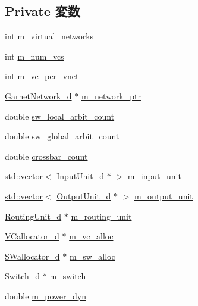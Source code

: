 \subsection*{Private 変数}
\begin{DoxyCompactItemize}
\item 
int \hyperlink{classRouter__d_af4cc96182e80059859793d92cb3dd769}{m\_\-virtual\_\-networks}
\item 
int \hyperlink{classRouter__d_a2e1a9213321dfa0386cdedaf6fc22996}{m\_\-num\_\-vcs}
\item 
int \hyperlink{classRouter__d_a2d66b8cad5144408ed492eeff4d37c2f}{m\_\-vc\_\-per\_\-vnet}
\item 
\hyperlink{classGarnetNetwork__d}{GarnetNetwork\_\-d} $\ast$ \hyperlink{classRouter__d_a06e7449414412196933a6b9c28556969}{m\_\-network\_\-ptr}
\item 
double \hyperlink{classRouter__d_a244af0e1954d860d9ad4333852a24f3f}{sw\_\-local\_\-arbit\_\-count}
\item 
double \hyperlink{classRouter__d_a9d9970c29868dc64bf72b49f315a674e}{sw\_\-global\_\-arbit\_\-count}
\item 
double \hyperlink{classRouter__d_a71b6aa69a23e317c11991da9ec7a8e4b}{crossbar\_\-count}
\item 
\hyperlink{classstd_1_1vector}{std::vector}$<$ \hyperlink{classInputUnit__d}{InputUnit\_\-d} $\ast$ $>$ \hyperlink{classRouter__d_a474451572c5e5813250c2f17ac3ec986}{m\_\-input\_\-unit}
\item 
\hyperlink{classstd_1_1vector}{std::vector}$<$ \hyperlink{classOutputUnit__d}{OutputUnit\_\-d} $\ast$ $>$ \hyperlink{classRouter__d_ab8b34c9f5479c61b8022de1aad185bae}{m\_\-output\_\-unit}
\item 
\hyperlink{classRoutingUnit__d}{RoutingUnit\_\-d} $\ast$ \hyperlink{classRouter__d_a2d457bbd61649141788ce8c605c19dbc}{m\_\-routing\_\-unit}
\item 
\hyperlink{classVCallocator__d}{VCallocator\_\-d} $\ast$ \hyperlink{classRouter__d_a3678318d3d02d98ad05963c811e0e8df}{m\_\-vc\_\-alloc}
\item 
\hyperlink{classSWallocator__d}{SWallocator\_\-d} $\ast$ \hyperlink{classRouter__d_ae3d1ed8dee3ce24e04923e5768f7d1a6}{m\_\-sw\_\-alloc}
\item 
\hyperlink{classSwitch__d}{Switch\_\-d} $\ast$ \hyperlink{classRouter__d_a4b58972c0989deb45fe3093d38106aaf}{m\_\-switch}
\item 
double \hyperlink{classRouter__d_a09287c991c636cbc01e82cd7d3f73dc2}{m\_\-power\_\-dyn}
\item 

\end{DoxyCompactItemize}
